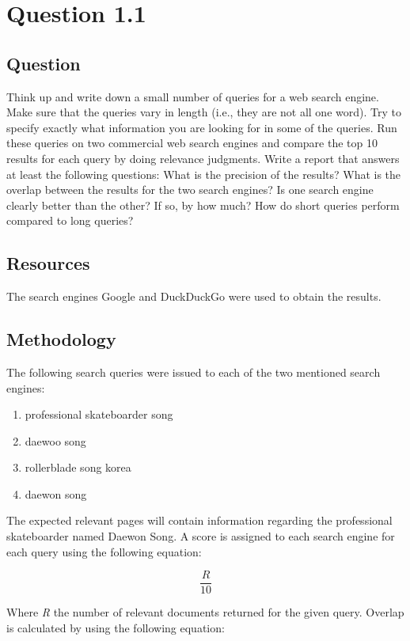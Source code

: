 \section{Question 1.1}

\subsection{Question}
Think up and write down a small number of queries for a web search engine.  Make sure that the queries vary in length (i.e., they are not all one word).  Try to specify exactly what information you are looking for in some of the queries.  Run these queries on two commercial web search engines and compare the top 10 results for each query by doing relevance judgments. Write a report that answers at least the following questions: What is the precision of the results? What is the overlap between the results for the two search engines? Is one search engine clearly better than the other? If so, by how much? How do short queries perform compared to long queries?


\subsection{Resources}
The search engines Google \cite{google} and DuckDuckGo \cite{duckduckgo} were used to obtain the results.\\


\subsection{Methodology}
The following search queries were issued to each of the two mentioned search engines:

\begin{enumerate}
    \item professional skateboarder song
    \item daewoo song
    \item rollerblade song korea
    \item daewon song
\end{enumerate}

The expected relevant pages will contain information regarding the professional skateboarder named Daewon Song.  A score is assigned to each search engine for each query using the following equation:

\[\frac{R}{10}\]

Where \textit{R} the number of relevant documents returned for the given query.  Overlap is calculated by using the following equation:

